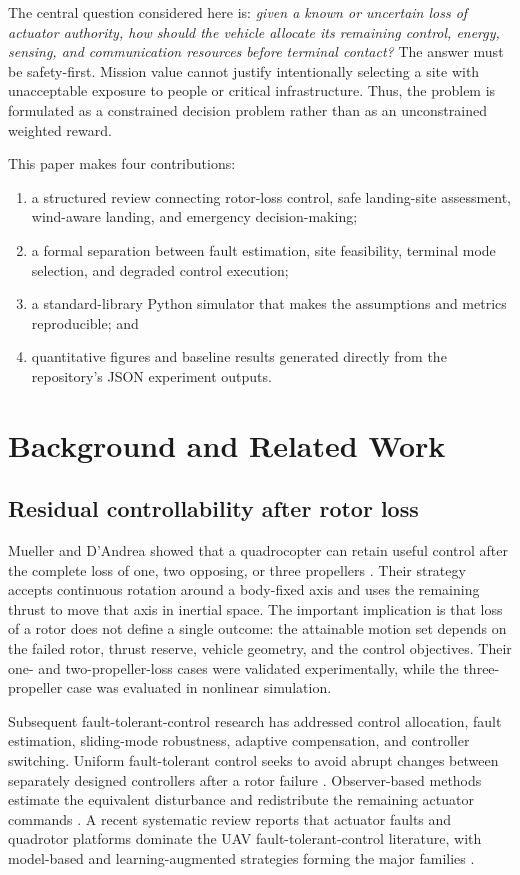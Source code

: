 \documentclass[conference]{IEEEtran}
\begin{document}
The central question considered here is:
\emph{given a known or uncertain loss of actuator authority, how should the
vehicle allocate its remaining control, energy, sensing, and communication
resources before terminal contact?} The answer must be safety-first. Mission
value cannot justify intentionally selecting a site with unacceptable exposure
to people or critical infrastructure. Thus, the problem is formulated as a
constrained decision problem rather than as an unconstrained weighted reward.

This paper makes four contributions:
\begin{enumerate}
\item a structured review connecting rotor-loss control, safe landing-site
assessment, wind-aware landing, and emergency decision-making;
\item a formal separation between fault estimation, site feasibility, terminal
mode selection, and degraded control execution;
\item a standard-library Python simulator that makes the assumptions and
metrics reproducible; and
\item quantitative figures and baseline results generated directly from the
repository's JSON experiment outputs.
\end{enumerate}

\section{Background and Related Work}
\subsection{Residual controllability after rotor loss}
Mueller and D'Andrea showed that a quadrocopter can retain useful control after
the complete loss of one, two opposing, or three propellers
\cite{mueller2014loss}. Their strategy accepts continuous rotation around a
body-fixed axis and uses the remaining thrust to move that axis in inertial
space. The important implication is that loss of a rotor does not define a
single outcome: the attainable motion set depends on the failed rotor, thrust
reserve, vehicle geometry, and the control objectives. Their one- and
two-propeller-loss cases were validated experimentally, while the
three-propeller case was evaluated in nonlinear simulation.

Subsequent fault-tolerant-control research has addressed control allocation,
fault estimation, sliding-mode robustness, adaptive compensation, and
controller switching. Uniform fault-tolerant control seeks to avoid abrupt
changes between separately designed controllers after a rotor failure
\cite{shi2022uniform}. Observer-based methods estimate the equivalent
disturbance and redistribute the remaining actuator commands
\cite{dob2026}. A recent systematic review reports that actuator faults and
quadrotor platforms dominate the UAV fault-tolerant-control literature, with
model-based and learning-augmented strategies forming the major families
\cite{ftcReview2026}.
\end{document}
